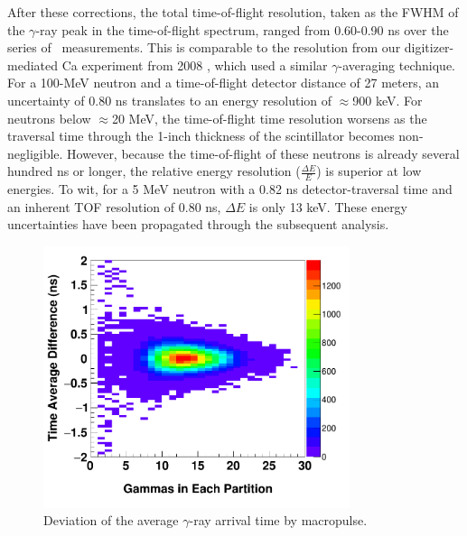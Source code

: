 After these corrections, the total time-of-flight
resolution, taken as the FWHM of the $\gamma$-ray peak in the time-of-flight
spectrum, ranged from 0.60-0.90 ns over the series of \tot\ measurements. This is comparable 
to the resolution from our digitizer-mediated Ca experiment from 2008 \cite{Shane2010},
which used a similar $\gamma$-averaging technique. For a 100-MeV
neutron and a time-of-flight detector distance of 27 meters, an
uncertainty of 0.80 ns translates to an energy resolution of $\approx$900 keV.
For neutrons below $\approx$20 MeV, the time-of-flight time resolution worsens as the 
traversal time through the 1-inch thickness of the scintillator becomes non-negligible.
However, because the time-of-flight of these neutrons is already several hundred ns or
longer, the relative energy resolution ($\frac{\Delta E}{E}$) is
superior at low energies. To wit, for a 5 MeV neutron with a 0.82 ns detector-traversal time and
an inherent TOF resolution of 0.80 ns, $\Delta E$ is only 13 keV. These energy uncertainties
have been propagated through the subsequent analysis.

\begin{figure}[h]
    \centering
    \includegraphics[width=0.8\textwidth]{figures/gammaCorrection2D.png}
    \caption[Deviation of the average $\gamma$-ray arrival time by macropulse]
    {Deviation of the average $\gamma$-ray arrival time by macropulse. }
    \label{GammaCorrection}
\end{figure}

